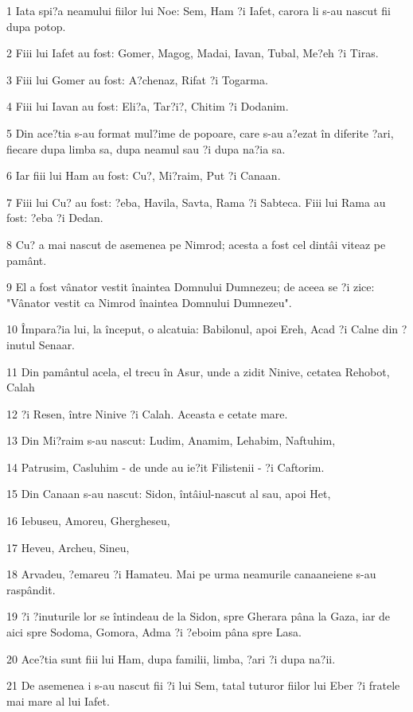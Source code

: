 \par 1 Iata spi?a neamului fiilor lui Noe: Sem, Ham ?i Iafet, carora li s-au nascut fii dupa potop.
\par 2 Fiii lui Iafet au fost: Gomer, Magog, Madai, Iavan, Tubal, Me?eh ?i Tiras.
\par 3 Fiii lui Gomer au fost: A?chenaz, Rifat ?i Togarma.
\par 4 Fiii lui Iavan au fost: Eli?a, Tar?i?, Chitim ?i Dodanim.
\par 5 Din ace?tia s-au format mul?ime de popoare, care s-au a?ezat în diferite ?ari, fiecare dupa limba sa, dupa neamul sau ?i dupa na?ia sa.
\par 6 Iar fiii lui Ham au fost: Cu?, Mi?raim, Put ?i Canaan.
\par 7 Fiii lui Cu? au fost: ?eba, Havila, Savta, Rama ?i Sabteca. Fiii lui Rama au fost: ?eba ?i Dedan.
\par 8 Cu? a mai nascut de asemenea pe Nimrod; acesta a fost cel dintâi viteaz pe pamânt.
\par 9 El a fost vânator vestit înaintea Domnului Dumnezeu; de aceea se ?i zice: "Vânator vestit ca Nimrod înaintea Domnului Dumnezeu".
\par 10 Împara?ia lui, la început, o alcatuia: Babilonul, apoi Ereh, Acad ?i Calne din ?inutul Senaar.
\par 11 Din pamântul acela, el trecu în Asur, unde a zidit Ninive, cetatea Rehobot, Calah
\par 12 ?i Resen, între Ninive ?i Calah. Aceasta e cetate mare.
\par 13 Din Mi?raim s-au nascut: Ludim, Anamim, Lehabim, Naftuhim,
\par 14 Patrusim, Casluhim - de unde au ie?it Filistenii - ?i Caftorim.
\par 15 Din Canaan s-au nascut: Sidon, întâiul-nascut al sau, apoi Het,
\par 16 Iebuseu, Amoreu, Ghergheseu,
\par 17 Heveu, Archeu, Sineu,
\par 18 Arvadeu, ?emareu ?i Hamateu. Mai pe urma neamurile canaaneiene s-au raspândit.
\par 19 ?i ?inuturile lor se întindeau de la Sidon, spre Gherara pâna la Gaza, iar de aici spre Sodoma, Gomora, Adma ?i ?eboim pâna spre Lasa.
\par 20 Ace?tia sunt fiii lui Ham, dupa familii, limba, ?ari ?i dupa na?ii.
\par 21 De asemenea i s-au nascut fii ?i lui Sem, tatal tuturor fiilor lui Eber ?i fratele mai mare al lui Iafet.
